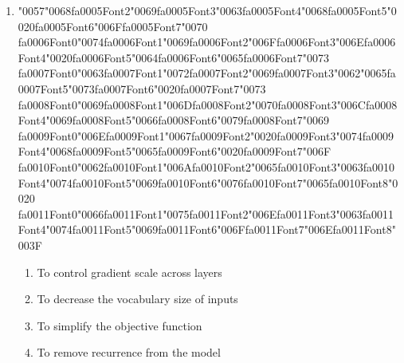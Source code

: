 \documentclass[12pt]{article}
\begin{document}
\begin{enumerate}[label=Q\arabic*.]
 \item {\char"0057}{\char"0068}{\csname fa0005Font2\endcsname\char"0069}{\csname fa0005Font3\endcsname\char"0063}{\csname fa0005Font4\endcsname\char"0068}{\csname fa0005Font5\endcsname\char"0020}{\csname fa0005Font6\endcsname\char"006F}{\csname fa0005Font7\endcsname\char"0070} {\csname fa0006Font0\endcsname\char"0074}{\csname fa0006Font1\endcsname\char"0069}{\csname fa0006Font2\endcsname\char"006F}{\csname fa0006Font3\endcsname\char"006E}{\csname fa0006Font4\endcsname\char"0020}{\csname fa0006Font5\endcsname\char"0064}{\csname fa0006Font6\endcsname\char"0065}{\csname fa0006Font7\endcsname\char"0073} {\csname fa0007Font0\endcsname\char"0063}{\csname fa0007Font1\endcsname\char"0072}{\csname fa0007Font2\endcsname\char"0069}{\csname fa0007Font3\endcsname\char"0062}{\char"0065}{\csname fa0007Font5\endcsname\char"0073}{\csname fa0007Font6\endcsname\char"0020}{\csname fa0007Font7\endcsname\char"0073} {\csname fa0008Font0\endcsname\char"0069}{\csname fa0008Font1\endcsname\char"006D}{\csname fa0008Font2\endcsname\char"0070}{\csname fa0008Font3\endcsname\char"006C}{\csname fa0008Font4\endcsname\char"0069}{\csname fa0008Font5\endcsname\char"0066}{\csname fa0008Font6\endcsname\char"0079}{\csname fa0008Font7\endcsname\char"0069} {\csname fa0009Font0\endcsname\char"006E}{\csname fa0009Font1\endcsname\char"0067}{\csname fa0009Font2\endcsname\char"0020}{\csname fa0009Font3\endcsname\char"0074}{\csname fa0009Font4\endcsname\char"0068}{\csname fa0009Font5\endcsname\char"0065}{\csname fa0009Font6\endcsname\char"0020}{\csname fa0009Font7\endcsname\char"006F} {\csname fa0010Font0\endcsname\char"0062}{\csname fa0010Font1\endcsname\char"006A}{\csname fa0010Font2\endcsname\char"0065}{\csname fa0010Font3\endcsname\char"0063}{\csname fa0010Font4\endcsname\char"0074}{\csname fa0010Font5\endcsname\char"0069}{\csname fa0010Font6\endcsname\char"0076}{\csname fa0010Font7\endcsname\char"0065}{\csname fa0010Font8\endcsname\char"0020} {\csname fa0011Font0\endcsname\char"0066}{\csname fa0011Font1\endcsname\char"0075}{\csname fa0011Font2\endcsname\char"006E}{\csname fa0011Font3\endcsname\char"0063}{\csname fa0011Font4\endcsname\char"0074}{\csname fa0011Font5\endcsname\char"0069}{\csname fa0011Font6\endcsname\char"006F}{\csname fa0011Font7\endcsname\char"006E}{\csname fa0011Font8\endcsname\char"003F}
 \begin{enumerate}[label=(\Alph*)]
     \item To control gradient scale across layers
     \item To decrease the vocabulary size of inputs
     \item To simplify the objective function
     \item To remove recurrence from the model
 \end{enumerate}
 

\end{enumerate}
\end{document}
